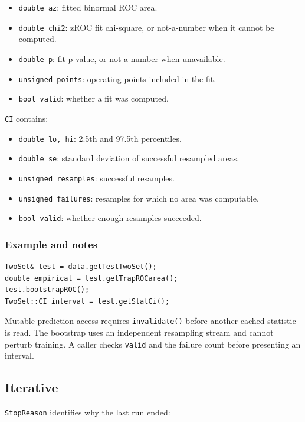 \begin{itemize}
\item \texttt{double az}: fitted binormal ROC area.
\item \texttt{double chi2}: zROC fit chi-square, or not-a-number when it cannot
      be computed.
\item \texttt{double p}: fit p-value, or not-a-number when unavailable.
\item \texttt{unsigned points}: operating points included in the fit.
\item \texttt{bool valid}: whether a fit was computed.
\end{itemize}

\texttt{CI} contains:

\begin{itemize}
\item \texttt{double lo, hi}: 2.5th and 97.5th percentiles.
\item \texttt{double se}: standard deviation of successful resampled areas.
\item \texttt{unsigned resamples}: successful resamples.
\item \texttt{unsigned failures}: resamples for which no area was computable.
\item \texttt{bool valid}: whether enough resamples succeeded.
\end{itemize}

\subsubsection{Example and notes}
\begin{verbatim}
TwoSet& test = data.getTestTwoSet();
double empirical = test.getTrapROCarea();
test.bootstrapROC();
TwoSet::CI interval = test.getStatCi();
\end{verbatim}
Mutable prediction access requires \texttt{invalidate()} before another cached
statistic is read.  The bootstrap uses an independent resampling stream and
cannot perturb training.  A caller checks \texttt{valid} and the failure count
before presenting an interval.

\subsection{Iterative}
\texttt{StopReason} identifies why the last run ended:

